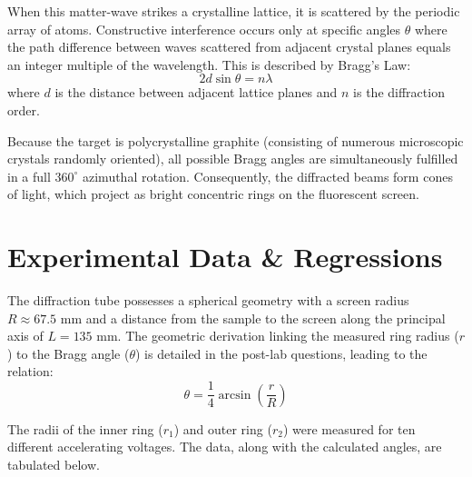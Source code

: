\documentclass[a4paper,11pt]{article}
\begin{document}
When this matter-wave strikes a crystalline lattice, it is scattered by the periodic array of atoms. Constructive interference occurs only at specific angles $\theta$ where the path difference between waves scattered from adjacent crystal planes equals an integer multiple of the wavelength. This is described by Bragg's Law:
\begin{equation} \label{eq:bragg}
    2 d \sin\theta = n \lambda
\end{equation}
where $d$ is the distance between adjacent lattice planes and $n$ is the diffraction order. 

Because the target is polycrystalline graphite (consisting of numerous microscopic crystals randomly oriented), all possible Bragg angles are simultaneously fulfilled in a full $360^\circ$ azimuthal rotation. Consequently, the diffracted beams form cones of light, which project as bright concentric rings on the fluorescent screen.

\section{Experimental Data \& Regressions}

The diffraction tube possesses a spherical geometry with a screen radius $R \approx 67.5\text{ mm}$ and a distance from the sample to the screen along the principal axis of $L = 135\text{ mm}$. The geometric derivation linking the measured ring radius ($r$) to the Bragg angle ($\theta$) is detailed in the post-lab questions, leading to the relation:
\begin{equation}
    \theta = \frac{1}{4} \arcsin\left(\frac{r}{R}\right)
\end{equation}

The radii of the inner ring ($r_1$) and outer ring ($r_2$) were measured for ten different accelerating voltages. The data, along with the calculated angles, are tabulated below.
\end{document}
